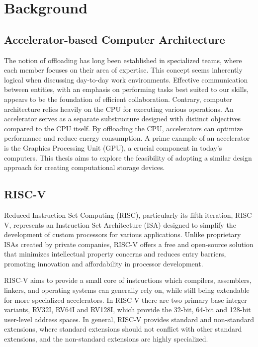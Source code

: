 \section{Background}
\subsection{Accelerator-based Computer Architecture}\label{sec:ACA}
The notion of offloading has long been established in specialized teams, where
each member focuses on their area of expertise. This concept seems inherently
logical when discussing day-to-day work environments. Effective communication
between entities, with an emphasis on performing tasks best suited to our
skills, appears to be the foundation of efficient collaboration. Contrary,
computer architecture relies heavily on the CPU for executing various
operations. An accelerator serves as a separate substructure designed with
distinct objectives compared to the CPU itself. By offloading the CPU,
accelerators can optimize performance and reduce energy consumption\cite{AA}. A
prime example of an accelerator is the Graphics Processing Unit (GPU), a crucial
component in today's computers. This thesis aims to explore the feasibility
of adopting a similar design approach for creating computational storage
devices.

\subsection{RISC-V}
Reduced Instruction Set Computing (RISC), particularly its fifth iteration,
RISC-V, represents an Instruction Set Architecture (ISA) designed to simplify
the development of custom processors for various applications. Unlike
proprietary ISAs created by private companies, RISC-V offers a free and
open-source solution that minimizes intellectual property concerns and reduces
entry barriers, promoting innovation and affordability in processor
development\cite{ISAfree}.

RISC-V aims to provide a small core of instructions which compilers, assemblers,
linkers, and operating systems can generally rely on, while still being
extendable for more specialized accelerators. In RISC-V there are two primary
base integer variants, RV32I, RV64I and RV128I, which provide the 32-bit, 64-bit
and 128-bit user-level address spaces. In general, RISC-V provides standard and
non-standard extensions, where standard extensions should not conflict with
other standard extensions, and the non-standard extensions are highly
specialized\cite{about_riscv, RISC_priv}.

